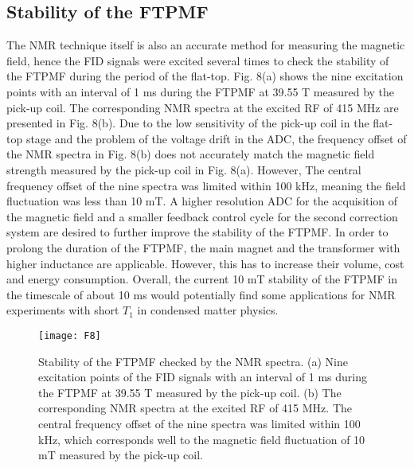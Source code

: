 \documentclass[lettersize,journal]{IEEEtran}
\begin{document}
\subsection{Stability of the FTPMF}
The NMR technique itself is also an accurate method for measuring the magnetic field, hence the FID signals were excited several times to check the stability of the FTPMF during the period of the flat-top. Fig. 8(a) shows the nine excitation points with an interval of 1 ms during the FTPMF at 39.55 T measured by the pick-up coil. The corresponding NMR spectra at the excited RF of 415 MHz are presented in Fig. 8(b). Due to the low sensitivity of the pick-up coil in the flat-top stage and the problem of the voltage drift in the ADC, the frequency offset of the NMR spectra in Fig. 8(b) does not accurately match the magnetic field strength measured by the pick-up coil in Fig. 8(a). However, The central frequency offset of the nine spectra was limited within 100 kHz, meaning the field fluctuation was less than 10 mT. A higher resolution ADC for the acquisition of the magnetic field and a smaller feedback control cycle for the second correction system are desired to further improve the stability of the FTPMF. In order to prolong the duration of the FTPMF, the main magnet and the transformer with higher inductance are applicable. However, this has to increase their volume, cost and energy consumption. Overall, the current 10 mT stability of the FTPMF in the timescale of about 10 ms would potentially find some applications for NMR experiments with short $T_1$ in condensed matter physics\cite{ref33}.

\begin{figure}[htbp]
\centering
\texttt{[image: F8]}
\caption{Stability of the FTPMF checked by the NMR spectra. (a) Nine excitation points of the FID signals with an interval of 1 ms during the FTPMF at 39.55 T measured by the pick-up coil. (b) The corresponding NMR spectra at the excited RF of 415 MHz. The central frequency offset of the nine spectra was limited within 100 kHz, which corresponds well to the magnetic field fluctuation of 10 mT measured by the pick-up coil.}
\end{figure}
\end{document}
